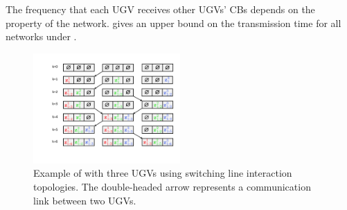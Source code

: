 	\begin{rem} 
		The frequency that each UGV receives other UGVs' CBs depends on the property of the network.
		 gives an upper bound on the transmission time for all {\fc} networks under {\proto}.
	\end{rem}
	
	
	
	\begin{figure}%
		\centering
		\includegraphics[width=0.5\textwidth]{figures/fifo}
		\caption{Example of {\proto} with three UGVs using switching line interaction topologies. The double-headed arrow represents a communication link between two UGVs.}
		\label{fig:\proto}
	\end{figure}		